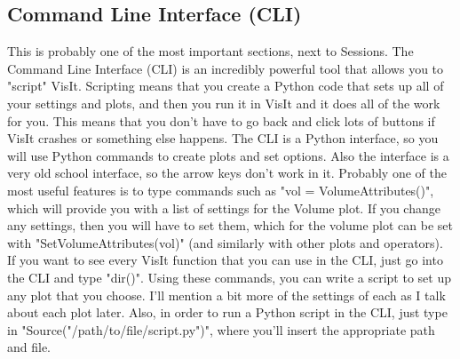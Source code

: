 \documentclass[english]{article}
\begin{document}
    \subsection{Command Line Interface (CLI)}
    This is probably one of the most important sections, next to Sessions. The Command Line Interface (CLI) 
    is an incredibly powerful tool that allows you to "script" VisIt. Scripting means that you create a 
    Python code that sets up all of your settings and plots, and then you run it in VisIt and it does all
    of the work for you. This means that you don't have to go back and click lots of buttons if VisIt
    crashes or something else happens. The CLI is a Python interface, so you will use Python commands to
    create plots and set options. Also the interface is a very old school interface, so the arrow keys
    don't work in it. Probably one of the most useful features is to type commands such as 
    "vol = VolumeAttributes()", which will provide you with a list of settings for the Volume plot. If you 
    change any settings, then you will have to set them, which for the volume plot can be set with 
    "SetVolumeAttributes(vol)" (and similarly with other plots and operators). If you want to see every 
    VisIt function that you can use in the CLI, just go into the CLI and type "dir()". Using these commands, 
    you can write a script to set up any plot that you choose. I'll mention a bit more of the settings of 
    each as I talk about each plot later. Also, in order to run a Python script in the CLI, just type in 
    "Source("/path/to/file/script.py")", where you'll insert the appropriate path and file.  
\end{document}

